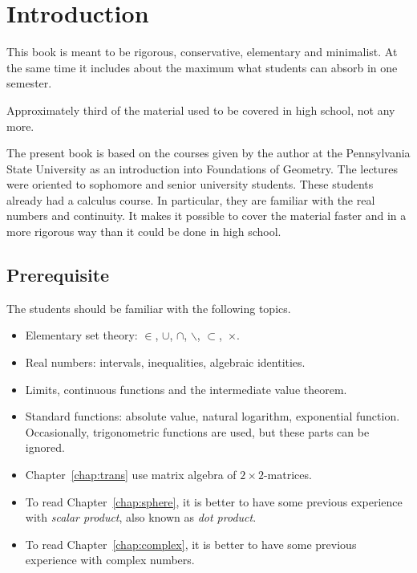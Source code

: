 \chapter*{Introduction}

This book is meant to be 
rigorous, 
conservative, 
elementary and
minimalist.
At the same time it includes about the maximum what students can absorb in one semester.

Approximately third of the material used to be covered in high school, not any more.

The present book is based 
on the courses given by the author 
at the Pennsylvania State University
as an introduction into Foundations of Geometry.
The lectures were oriented to sophomore and senior university students.  
These students already had a calculus course.
In particular, they are familiar with the real numbers and continuity.
It makes it possible to cover the material faster 
and  in a more rigorous way
than it could be done in high school.

\section*{Prerequisite}

The students should be familiar 
with the following topics.
\begin{itemize}
\item Elementary set theory: 
$\in$,
$\cup$, 
$\cap$,
$\backslash$,
$\subset$,~$\times$.
\item Real numbers: intervals, inequalities, algebraic identities.
\item Limits, continuous functions and the intermediate value theorem.
\item Standard functions: 
absolute value, 
natural logarithm,
exponential function. 
Occasionally, trigonometric functions  are used, 
but these parts can be ignored.
\item  Chapter~\ref{chap:trans} 
use matrix algebra of $2{\times}2$-matrices.
\item To read Chapter~\ref{chap:sphere}, it is better to have some previous experience with {}\emph{scalar product}, also known as {}\emph{dot product}.
\item To read Chapter~\ref{chap:complex}, it is better to have some previous experience with complex numbers.
\end{itemize} 

